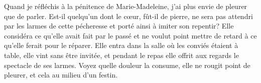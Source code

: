  Quand je réfléchis à la pénitence de Marie-Madeleine,
	j’ai plus envie de pleurer que de parler.
Est-il quelqu’un dont le cœur, fût-il de pierre,
	ne sera pas attendri par les larmes de cette pécheresse
	et porté ainsi à imiter son repentir?
Elle considéra ce qu’elle avait fait par le passé
	et ne voulut point mettre de retard à ce qu’elle ferait pour le réparer.
Elle entra dans la salle où les conviés étaient à table,
	elle vint sans être invitée,
	et pendant le repas elle offrit aux regards le spectacle de ses larmes.
Voyez quelle douleur la consume,
	elle ne rougit point de pleurer, et cela au milieu d’un festin.

